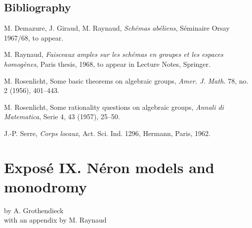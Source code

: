 \documentclass[11pt]{article}
\providecommand{\Ql}{\mathbb Q_\ell}
\begin{document}
\subsection*{Bibliography}
\begin{enumerate}[label={[\arabic*]}]
\item M. Demazure, J. Giraud, M. Raynaud, \emph{Schémas abéliens}, Séminaire Orsay 1967/68, to appear.
\item M. Raynaud, \emph{Faisceaux amples sur les schémas en groupes et les espaces homogènes}, Paris thesis, 1968, to appear in Lecture Notes, Springer.
\item M. Rosenlicht, Some basic theorems on algebraic groups, \emph{Amer. J. Math.} 78, no. 2 (1956), 401--443.
\item M. Rosenlicht, Some rationality questions on algebraic groups, \emph{Annali di Matematica}, Serie 4, 43 (1957), 25--50.
\item J.-P. Serre, \emph{Corps locaux}, Act. Sci. Ind. 1296, Hermann, Paris, 1962.
\end{enumerate}



\providecommand{\NS}{\operatorname{NS}}
\providecommand{\Biext}{\operatorname{Biext}}
\providecommand{\rk}{\operatorname{rk}}
\providecommand{\Car}{\operatorname{char}}
\providecommand{\BT}{\operatorname{BT}}
\providecommand{\cW}{\mathcal W}
\providecommand{\cL}{\mathcal L}
\providecommand{\cT}{\mathcal T}
\providecommand{\cU}{\mathcal U}
\providecommand{\cB}{\mathcal B}
\providecommand{\cA}{\mathcal A}
\providecommand{\Id}{\operatorname{Id}}
\providecommand{\I}{I}
\providecommand{\Tate}{T}
\providecommand{\Ph}{\Phi}
\providecommand{\Zell}{\mathbb Z_\ell}
\providecommand{\Ql}{\mathbb Q_\ell}
\providecommand{\Gmk}{\mathbb G_m}


\section*{Expos\'e IX. N\'eron models and monodromy}
\begin{center}
by A. Grothendieck\\
with an appendix by M. Raynaud
\end{center}
\end{document}
